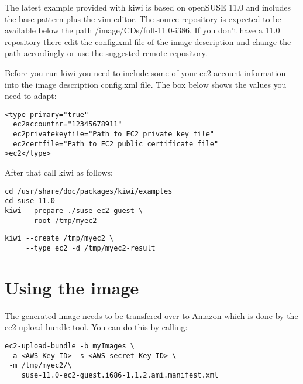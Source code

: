 The latest example provided with kiwi is based on openSUSE 11.0 and
includes the base pattern plus the vim editor. The source repository
is expected to be available below the path /image/CDs/full-11.0-i386.
If you don't have a 11.0 repository there edit the config.xml file of
the image description and change the path accordingly or use the
suggested remote repository.

Before you run kiwi you need to include some of your ec2 account
information into the image description config.xml file. The box
below shows the values you need to adapt:

\begin{Command}{13cm}
\begin{verbatim}
<type primary="true"
  ec2accountnr="12345678911"
  ec2privatekeyfile="Path to EC2 private key file"
  ec2certfile="Path to EC2 public certificate file"
>ec2</type>
\end{verbatim}
\end{Command}

After that call kiwi as follows:

\begin{Command}{13cm}
\begin{verbatim}
cd /usr/share/doc/packages/kiwi/examples
cd suse-11.0
kiwi --prepare ./suse-ec2-guest \
     --root /tmp/myec2
\end{verbatim}
\end{Command}

\begin{Command}{13cm}
\begin{verbatim}
kiwi --create /tmp/myec2 \
     --type ec2 -d /tmp/myec2-result
\end{verbatim}
\end{Command}

\section{Using the image}
The generated image needs to be transfered over to Amazon which is
done by the ec2-upload-bundle tool. You can do this by calling:

\begin{Command}{13cm}
\begin{verbatim}
ec2-upload-bundle -b myImages \
 -a <AWS Key ID> -s <AWS secret Key ID> \
 -m /tmp/myec2/\
    suse-11.0-ec2-guest.i686-1.1.2.ami.manifest.xml
\end{verbatim}
\end{Command}

